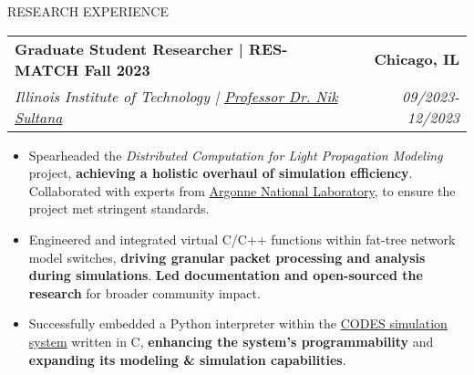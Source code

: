 \documentclass{resume} %
\begin{document}
\vspace{-5pt} %
\begin{rSection}{RESEARCH EXPERIENCE}

   \begin{tabularx}{\textwidth}{@{}X r}
      \textbf{Graduate Student Researcher | RES-MATCH Fall 2023} & \textbf{Chicago, IL} \\
      \textit{Illinois Institute of Technology | \href{http://www.cs.iit.edu/~nsultana1/}{Professor Dr. Nik Sultana}} & \textit{09/2023-12/2023} \\
   \end{tabularx}


   \begin{minipage}[t]{1\textwidth}
      \begin{itemize}[left=0pt, nosep, before=\vspace{-0.5\baselineskip}]

\item \small Spearheaded the \textit{Distributed Computation for Light Propagation Modeling} project, \textbf{achieving a holistic overhaul of simulation efficiency}. Collaborated with experts from \href{https://www.anl.gov/profile/kevin-a-brown}{Argonne National Laboratory}, to ensure the project met stringent standards.
\item \small Engineered and integrated virtual C/C++ functions within fat-tree network model switches, \textbf{driving granular packet processing and analysis during simulations}. \textbf{Led documentation and open-sourced the research} for broader community impact.
\item \small Successfully embedded a Python interpreter within the \href{https://github.com/codes-org/codes/}{CODES simulation system} written in C, \textbf{enhancing the system's programmability} and \textbf{expanding its modeling \& simulation capabilities}.


      \end{itemize}
   \end{minipage}


\end{rSection}
\end{document}
